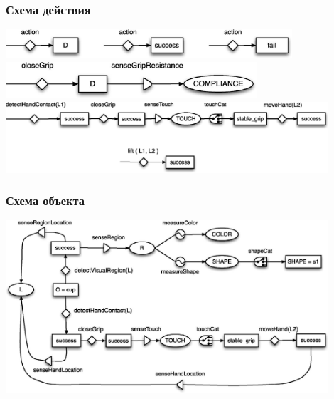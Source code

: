 \documentclass[default]{beamer}
\begin{document}
	\begin{frame}
		\frametitle{Схема действия}
		
		\begin{center}
			\includegraphics[width=0.8\textwidth]{roy_act_proj}
			\vspace{1cm}			
			\includegraphics[width=0.7\textwidth]{roy_active}
			\vspace{1cm}
			\includegraphics[width=0.9\textwidth]{roy_complex}
		\end{center}
	\end{frame}

	\begin{frame}
		\frametitle{Схема объекта}

		\begin{center}
			\includegraphics[width=0.9\textwidth]{roy_object}
		\end{center}
		
	\end{frame}
	
\end{document}
